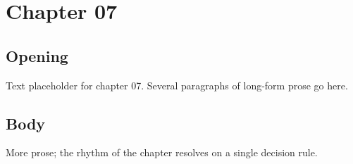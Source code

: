\chapter{Chapter 07}
\section{Opening}
Text placeholder for chapter 07. Several paragraphs of long-form prose go here.
\section{Body}
More prose; the rhythm of the chapter resolves on a single decision rule.

